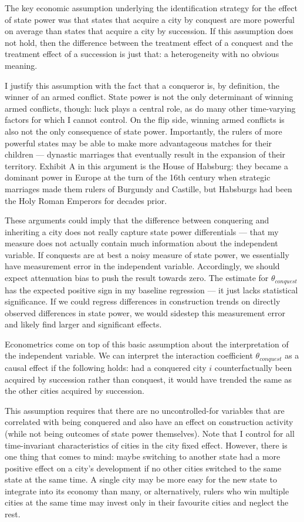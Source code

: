 \documentclass[11pt, a4paper]{article}
\begin{document}
The key economic assumption underlying the identification strategy for the effect of state power was that states that acquire a city by conquest are more powerful on average than states that acquire a city by succession. If this assumption does not hold, then the difference between the treatment effect of a conquest and the treatment effect of a succession is just that: a heterogeneity with no obvious meaning.

I justify this assumption with the fact that a conqueror is, by definition, the winner of an armed conflict. State power is not the only determinant of winning armed conflicts, though: luck plays a central role, as do many other time-varying factors for which I cannot control. On the flip side, winning armed conflicts is also not the only consequence of state power. Importantly, the rulers of more powerful states may be able to make more advantageous matches for their children --- dynastic marriages that eventually result in the expansion of their territory. Exhibit A in this argument is the House of Habsburg: they became a dominant power in Europe at the turn of the 16th century when strategic marriages made them rulers of Burgundy and Castille, but Habsburgs had been the Holy Roman Emperors for decades prior.

These arguments could imply that the difference between conquering and inheriting a city does not really capture state power differentials --- that my measure does not actually contain much information about the independent variable. If conquests are at best a noisy measure of state power, we essentially have measurement error in the independent variable. Accordingly, we should expect attenuation bias to push the result towards zero. The estimate for $\theta_{conquest}$ has the expected positive sign in my baseline regression --- it just lacks statistical significance. If we could regress differences in construction trends on directly observed differences in state power, we would sidestep this measurement error and likely find larger and significant effects. 

Econometrics come on top of this basic assumption about the interpretation of the independent variable. We can interpret the interaction coefficient $\theta_{conquest}$ as a causal effect if the following holds: had a conquered city $i$ counterfactually been acquired by succession rather than conquest, it would have trended the same as the other cities acquired by succession. 

This assumption requires that there are no uncontrolled-for variables that are correlated with being conquered and also have an effect on construction activity (while not being outcomes of state power themselves). Note that I control for all time-invariant characteristics of cities in the city fixed effect. However, there is one thing that comes to mind: maybe switching to another state had a more positive effect on a city's development if no other cities switched to the same state at the same time. A single city may be more easy for the new state to integrate into its economy than many, or alternatively, rulers who win multiple cities at the same time may invest only in their favourite cities and neglect the rest. 
\end{document}
